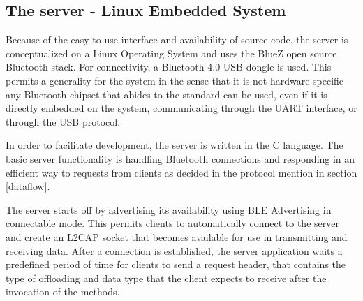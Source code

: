 
\subsection{The server - Linux Embedded System}

Because of the easy to use interface and availability of source code, the server is conceptualized on a Linux Operating System and uses the BlueZ\cite{BlueZ} open source Bluetooth stack. For connectivity, a Bluetooth 4.0 USB dongle is used. This permits a generality for the  system in the sense that it is not hardware specific - any Bluetooth chipset that abides to the standard can be used, even if it is directly embedded on the system, communicating through the UART interface, or through the USB protocol.

In order to facilitate development, the server is written in the C language. The basic server functionality is handling Bluetooth connections and responding in an efficient way to requests from clients as decided in the protocol mention in section \ref{dataflow}.

The server starts off by advertising its availability using BLE Advertising\cite{BLE2} in connectable mode. This permits clients to automatically connect to the server and create an L2CAP socket that becomes available for use in transmitting and receiving data. After a connection is established, the server application waits a predefined period of time for clients to send a request header, that contains the type of offloading and data type that the client expects to receive after the invocation of the methods.


